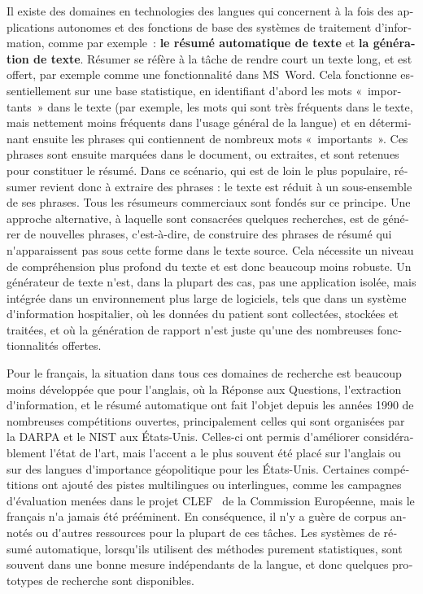 \begin{french}
\begin{multicols}{2}
Il existe des domaines en technologies des langues qui concernent à la fois des applications autonomes et des fonctions de base des systèmes de traitement d'information, comme par exemple~: {\bf le résumé automatique de texte} et {\bf la génération de texte}. Résumer se réfère à la tâche de
rendre court un texte long, et est offert, par exemple comme une
fonctionnalité dans MS~Word. Cela fonctionne essentiellement sur une
base statistique, en identifiant d{\mbox '}abord les mots
«~importants~» dans le texte (par exemple, les mots qui sont très
fréquents dans le texte, mais nettement moins fréquents dans l{\mbox
  '}usage général de la langue) et en déterminant ensuite les phrases
qui contiennent de nombreux mots «~importants~». Ces phrases sont
ensuite marquées dans le document, ou extraites, et sont retenues pour
constituer le résumé. Dans ce scénario, qui est de loin le plus
populaire, résumer revient donc à extraire des phrases : le texte est
réduit à un sous-ensemble de ses phrases. Tous les résumeurs
commerciaux sont fondés sur ce principe. Une approche alternative, à laquelle
sont consacrées quelques recherches, est de générer de nouvelles
phrases, c{\mbox '}est-à-dire, de construire des phrases de résumé qui
n{\mbox '}apparaissent pas sous cette forme dans le texte source. Cela
nécessite un niveau de compréhension plus profond du texte et est donc
beaucoup moins robuste. Un générateur de texte n{\mbox '}est, dans la
plupart des cas, pas une application isolée, mais intégrée dans un
environnement plus large de logiciels, tels que dans un système
d{\mbox '}information hospitalier, où les données du patient sont
collectées, stockées et traitées, et où la génération de rapport
n{\mbox '}est juste qu{\mbox '}une des nombreuses fonctionnalités
offertes.

Pour le français, la situation dans tous ces domaines de recherche est
beaucoup moins développée que pour l{\mbox '}anglais, où la Réponse aux
Questions, l{\mbox '}extraction d{\mbox '}information, et le résumé automatique ont
fait l{\mbox '}objet depuis les années 1990 de nombreuses compétitions
ouvertes, principalement celles qui sont organisées par la DARPA et le
NIST aux États-Unis. Celles-ci ont permis d{\mbox '}améliorer considérablement
l{\mbox '}état de l{\mbox '}art, mais l{\mbox '}accent a le plus souvent été placé sur
l{\mbox '}anglais ou sur des langues d{\mbox '}importance géopolitique pour les
États-Unis. Certaines compétitions ont ajouté des pistes multilingues
ou interlingues, comme les campagnes d{\mbox '}évaluation menées dans le
projet CLEF~\cite{clef} de la Commission Européenne, mais le français n{\mbox '}a jamais
été prééminent. En conséquence, il n{\mbox '}y a guère de corpus annotés ou
d{\mbox '}autres ressources pour la plupart de ces tâches. Les systèmes de
résumé automatique, lorsqu{\mbox '}ils utilisent des méthodes purement
statistiques, sont souvent dans une bonne mesure indépendants de la
langue, et donc quelques prototypes de recherche sont
disponibles. 


\end{multicols}
\end{french}
